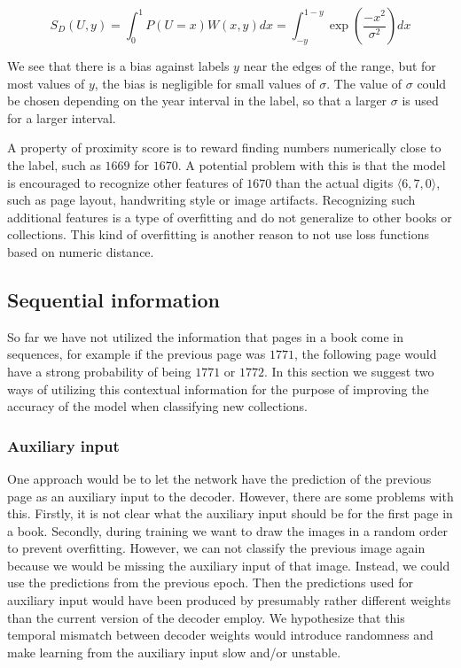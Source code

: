 \[
S_D(U, y) = \int_0^1 P(U=x) W(x, y) dx =
\int_{-y}^{1-y} \exp \left( \frac{-x^2}{\sigma^2} \right) dx
\]

We see that there is a bias against labels $y$ near the edges of the range, but for most values of $y$, the bias is negligible for small values of $\sigma$. The value of $\sigma$ could be chosen depending on the year interval in the label, so that a larger $\sigma$ is used for a larger interval.

A property of proximity score is to reward finding numbers numerically close to the label, such as $1669$ for $1670$. A potential problem with this is that the model is encouraged to recognize other features of $1670$ than the actual digits $\langle 6, 7, 0 \rangle$, such as page layout, handwriting style or image artifacts. Recognizing such additional features is a type of overfitting and do not generalize to other books or collections.
This kind of overfitting is another reason to not use loss functions based on numeric distance.

\subsection{Sequential information}

So far we have not utilized the information that pages in a book come in sequences, for example if the previous page was $1771$, the following page would have a strong probability of being $1771$ or $1772$.
In this section we suggest two ways of utilizing this contextual information for the purpose of improving the accuracy of the model when classifying new collections.

\subsubsection{Auxiliary input}

One approach would be to let the network have the prediction of the previous page as an auxiliary input to the decoder. However, there are some problems with this. Firstly, it is not clear what the auxiliary input should be for the first page in a book. Secondly, during training we want to draw the images in a random order to prevent overfitting. However, we can not classify the previous image again because we would be missing the auxiliary input of that image. Instead, we could use the predictions from the previous epoch. Then the predictions used for auxiliary input would have been produced by presumably rather different weights than the current version of the decoder employ. We hypothesize that this temporal mismatch between decoder weights would introduce randomness and make learning from the auxiliary input slow and/or unstable.

